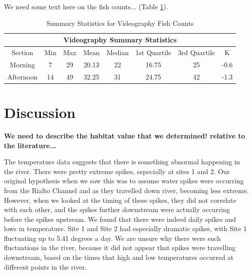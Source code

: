\documentclass{article}\usepackage[]{graphicx}\usepackage[]{color}
\begin{document}
We need some text here on the fish counts... (Table \ref{tab:fishcounts}).

\begin{table}
\caption{Summary Statistics for Videography Fish Counts}
\begin{tabular}{cccccccc}
 \hline
 \multicolumn{8}{c}{Videography Summary Statistics} \\
 \hline
 Section & Min & Max & Mean & Median & 1st Quartile & 3rd Quartile & K\\
 \hline
 Morning & 7 & 29 & 20.13 & 22  & 16.75 & 25 & -0.6\\
 Afternoon & 14 & 49 & 32.25 & 31 & 24.75 &  42 & -1.3\\
 \hline
\end{tabular}
\label{tab:fishcounts}
\end{table}

\section{Discussion}

\textbf{We need to describe the habitat value that we determined! relative to the literature...}

The temperature data suggests that there is something abnormal happening in the river. There were pretty extreme spikes, especially at sites 1 and 2. Our original hypothesis when we saw this was to assume water spikes were occurring from the Rialto Channel and as they travelled down river, becoming less extreme. However, when we looked at the timing of these spikes, they did not correlate with each other, and the spikes further downstream were actually occurring before the spikes upstream. We found that there were indeed daily spikes and lows in temperature. Site 1 and Site 2 had especially dramatic spikes, with Site 1 fluctuating up to 5.41 degrees a day. We are unsure why there were such fluctuations in the river, because it did not appear that spikes were travelling downstream, based on the times that high and low temperatures occurred at different points in the river. 
\end{document}
